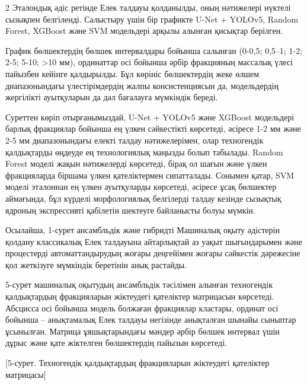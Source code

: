 \begin{multicols}{2}
Эталондық әдіс ретінде Елек талдауы қолданылды, оның нәтижелері нүктелі
сызықпен белгіленді. Салыстыру үшін бір графикте U-Net + YOLOv5, Random
Forest, XGBoost және SVM модельдері арқылы алынған қисықтар берілген.

График бөлшектердің бөлшек интервалдары бойынша салынған (0-0,5; 0,5--1;
1-2; 2-5; 5-10; \textgreater 10 мм), ординаттар осі бойынша әрбір
фракцияның массалық үлесі пайызбен кейінге қалдырылды. Бұл көрініс
бөлшектердің жеке өлшем диапазонындағы үлестірімдердің жалпы
консистенциясын да, модельдердің жергілікті ауытқуларын да дәл бағалауға
мүмкіндік береді.

Суреттен көріп отырғанымыздай, U-Net + YOLOv5 және XGBoost модельдері
барлық фракциялар бойынша ең үлкен сәйкестікті көрсетеді, әсіресе 1-2 мм
және 2-5 мм диапазонындағы електі талдау нәтижелерімен, олар техногендік
қалдықтарды өңдеуде ең технологиялық маңызды болып табылады. Random
Forest моделі жақын нәтижелерді көрсетеді, бірақ ол шағын және үлкен
фракцияларда біршама үлкен қателіктермен сипатталады. Сонымен қатар, SVM
моделі эталоннан ең үлкен ауытқуларды көрсетеді, әсіресе ұсақ бөлшектер
аймағында, бұл күрделі морфологиялық белгілерді талдау кезінде сызықтық
ядроның экспрессивті қабілетін шектеуге байланысты болуы мүмкін.

Осылайша, 1-сурет ансамбльдік және гибридті Машиналық оқыту әдістерін
қолдану классикалық Елек талдауына айтарлықтай аз уақыт шығындарымен
және процестерді автоматтандырудың жоғары деңгейімен жоғары сәйкестік
дәрежесіне қол жеткізуге мүмкіндік беретінін анық растайды.

5-сурет машиналық оқытудың ансамбльдік тәсілімен алынған техногендік
қалдықтардың фракцияларын жіктеудегі қателіктер матрицасын көрсетеді.
Абсцисса осі бойынша модель болжаған фракциялар кластары, ординат осі
бойынша -- анықтамалық Елек талдауы негізінде анықталған шынайы сыныптар
ұсынылған. Матрица ұяшықтарындағы мәндер әрбір бөлшек интервал үшін
дұрыс және қате жіктелген бөлшектердің пайызын көрсетеді.
\end{multicols}

[5-сурет. Техногендік қалдықтардың фракцияларын жіктеудегі
қателіктер матрицасы]

